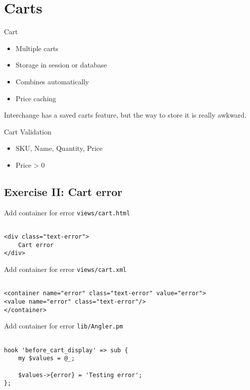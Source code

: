 \section{Carts}
\begin{frame}{Cart}
\begin{itemize}
\item Multiple carts
\item Storage in session or database
\item Combines automatically
\item Price caching
\end{itemize}
\end{frame}

Interchange has a saved carts feature, but the way to store it is
really awkward.

\begin{frame}{Cart Validation}
\begin{itemize}
\item SKU, Name, Quantity, Price
\item Price > 0
\end{itemize}
\end{frame}

\subsection{Exercise II: Cart error}
\begin{frame}[fragile]{Add container for error}
\verb|views/cart.html|

\begin{lstlisting}

<div class="text-error">
    Cart error
</div>
\end{lstlisting}
\end{frame}

\begin{frame}[fragile]{Add container for error}
\verb|views/cart.xml|

\begin{lstlisting}

<container name="error" class="text-error" value="error">
<value name="error" class="text-error"/>
</container>
\end{lstlisting}
\end{frame}

\begin{frame}[fragile]{Add container for error}
\verb|lib/Angler.pm|

\begin{lstlisting}

hook 'before_cart_display' => sub {
    my $values = @_;

    $values->{error} = 'Testing error';
};
\end{lstlisting}
\end{frame}

